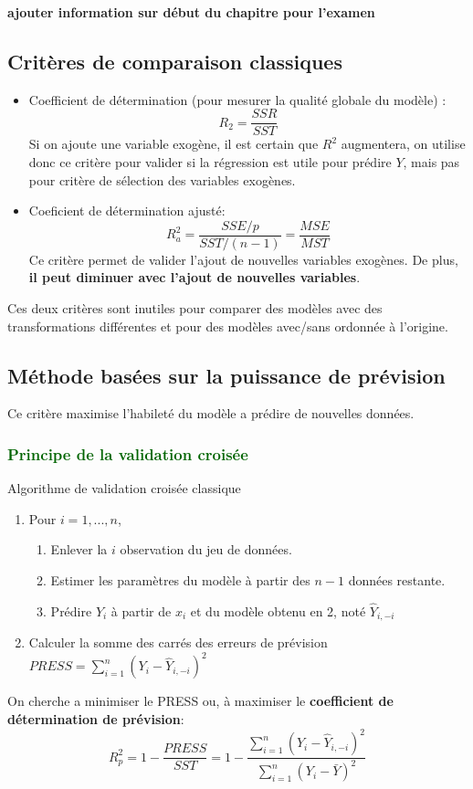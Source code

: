 \documentclass[10pt, french]{article}
\begin{document}
\begin{multicols*}{3}
\textbf{ajouter information sur début du chapitre pour l'examen}

\subsection*{Critères de comparaison classiques}
\begin{itemize}
	\item Coefficient de détermination (pour mesurer la qualité globale du modèle) :
	\[ R_2 = \frac{SSR}{SST} \]
	Si on ajoute une variable exogène, il est certain que $R^2$ augmentera, on utilise donc ce critère pour valider si la régression est utile pour prédire $Y$, mais pas pour critère de sélection des variables exogènes.
	\item Coeficient de détermination ajusté:
	\[ R_a^2 = \frac{SSE / p}{SST / (n-1)} = \frac{MSE}{MST} \]
	Ce critère permet de valider l'ajout de nouvelles variables exogènes. De plus, \textbf{il peut diminuer avec l'ajout de nouvelles variables}.
\end{itemize}
Ces deux critères sont inutiles pour comparer des modèles avec des transformations différentes et pour des modèles avec/sans ordonnée à l'origine.

\subsection*{Méthode basées sur la puissance de prévision}
Ce critère maximise l'habileté du modèle a prédire de nouvelles données.

\subsubsection*{\textcolor{darkgreen}{Principe de la validation croisée}}

\begin{algo}{Algorithme de validation croisée classique}
\begin{enumerate}
\item Pour $i = 1, ..., n$,
\begin{enumerate}[label=1.\arabic*]
	\item Enlever la $i$ observation du jeu de données.
	\item Estimer les paramètres du modèle à partir des $n - 1$ données restante.
	\item Prédire $Y_i$ à partir de $x_i$ et du modèle obtenu en 2, noté $\hat{Y}_{i,-i}$
\end{enumerate}
\item Calculer la somme des carrés des erreurs de prévision $PRESS = \sum_{i=1}^n (Y_i - \hat{Y}_{i,-i})^2$
\end{enumerate}
\end{algo}
	On cherche a minimiser le PRESS ou, à maximiser le \textbf{coefficient de détermination de prévision}:
	\[ R_p^2 = 1 - \frac{PRESS}{SST} = 1 - \frac{\sum_{i=1}^n (Y_i - \hat{Y}_{i,-i})^2}{\sum_{i=1}^n (Y_i - \bar{Y})^2}\]

\end{multicols*}
\end{document}
